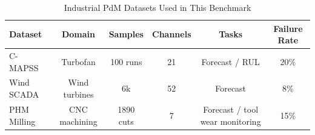 \begin{table}[htbp]
\caption{Industrial PdM Datasets Used in This Benchmark}
\label{tab:datasets}
\centering
\begin{tabular}{lccccc}
\toprule
Dataset & Domain & Samples & Channels & Tasks & Failure Rate \\
\midrule
C-MAPSS~\cite{saxena2008cmapss} & Turbofan & 100 runs & 21 & Forecast / RUL & 20\% \\
Wind SCADA & Wind turbines & 6k & 52 & Forecast & 8\% \\
PHM Milling~\cite{phm2010milling} & CNC machining & 1890 cuts & 7 & Forecast / tool wear monitoring & 15\% \\
\bottomrule
\end{tabular}
\end{table}

